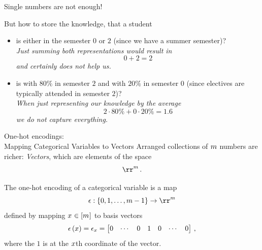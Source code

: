 \documentclass{beamer}
\begin{document}
    \begin{frame}{Single numbers are not enough!}

        But how to store the knowledge, that a student
        \begin{itemize}
            \item is either in the semester $0$ or $2$ (since we have a summer semester)? \\
            \emph{Just summing both representations would result in
                \[ 0 + 2 = 2 \]
                and certainly does not help us.}
            \item is with $80\%$ in semester $2$ and with $20\%$ in semester $0$ (since electives are typically attended in semester $2$)? \\
            \emph{When just representing our knowledge by the average
                \[ 2\cdot 80\% + 0 \cdot 20\% = 1.6 \]
                we do not capture everything.}
        \end{itemize}

    \end{frame}


    \begin{frame}{One-hot encodings: \\
    Mapping Categorical Variables to Vectors}
        Arranged collections of $m$ numbers are richer: \emph{Vectors}, which are elements of the space
        \[ \rr^{\catdim} \, . \]
        \begin{definition}
            The one-hot encoding of a categorical variable is a map
            \[ \onehotmap : \{0,1,\ldots,\catdim-1\} \rightarrow \rr^{\catdim}\]
            defined by mapping $x_{}\in[m_{}]$ to basis vectors
            \begin{align*}
                \epsilon \left( x \right) =
                \epsilon_{x} = \begin{bmatrix}
                                              0 & \cdots & 0 & 1 &  0 & \cdots & 0
                \end{bmatrix} \, ,
            \end{align*}
            where the $1$ is at the $x$th coordinate of the vector.
        \end{definition}
    \end{frame}
\end{document}

